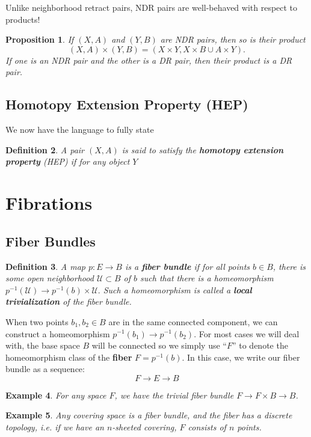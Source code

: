 \documentclass{article}
\newtheorem{definition}{Definition}[subsection]
\newtheorem{proposition}[definition]{Proposition}
\newtheorem{example}[definition]{Example}
\begin{document}
Unlike neighborhood retract pairs, NDR pairs are well-behaved with respect to products!

\begin{proposition}
  If $(X,A)$ and $(Y,B)$ are NDR pairs, then so is their product
  \[(X,A)\times (Y, B) = (X\times Y, X\times B\cup A\times Y).\]
  If one is an NDR pair and the other is a DR pair, then their product is a DR pair.
\end{proposition}

\subsection{Homotopy Extension Property (HEP)}
We now have the language to fully state 

\begin{definition}
  A pair $(X,A)$ is said to satisfy the \textbf{homotopy extension property} (HEP) if for any object $Y$
\end{definition}

\section{Fibrations}

\subsection{Fiber Bundles}

\begin{definition}
  A map $p : E \to B$ is a \textbf{fiber bundle} if for all points $b\in B$, there is some open neighborhood $\mathcal{U}\subset B$ of $b$ such that there is a homeomorphism $p^{-1}(\mathcal{U}) \to p^{-1}(b)\times \mathcal{U}.$ Such a homeomorphism is called a \textbf{local trivialization} of the fiber bundle.
\end{definition}

When two points $b_1, b_2\in B$ are in the same connected component, we can construct a homeomorphism $p^{-1}(b_1)\to p^{-1}(b_2)$. For most cases we will deal with, the base space $B$ will be connected so we simply use ``$F$'' to denote the homeomorphism class of the \textbf{fiber} $F = p^{-1}(b)$. 
In this case, we write our fiber bundle as a sequence:
\[
    F \to E \to B
\]
\begin{example}
  For any space $F$, we have the trivial fiber bundle $F \to F\times B \to B$.
\end{example}

\begin{example}
  Any covering space is a fiber bundle, and the fiber has a discrete topology, i.e. if we have an $n$-sheeted covering, $F$ consists of $n$ points.
\end{example}
\end{document}
